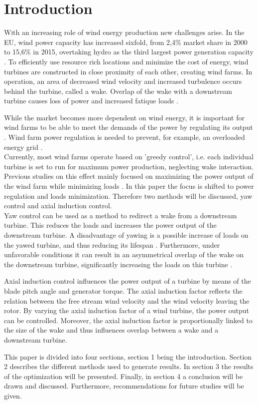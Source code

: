 \section{Introduction}
\lettrine[nindent=0em,lines=3]
With an increasing role of wind energy production new challenges arise\cite{Nat2016}. In the EU, wind power capacity has increased sixfold, from 2,4\% market share in 2000 to 15,6\% in 2015, overtaking hydro as the third largest power generation capacity \cite{EWEA2016}. To efficiently use resource rich locations and minimize the cost of energy, wind turbines are constructed in close proximity of each other, creating wind farms. In operation, an area of decreased wind velocity and increased turbulence occurs behind the turbine, called a wake. Overlap of the wake with a downstream turbine causes loss of power and increased fatique loads \cite{Boersma2017, Wilson2017, Dijk2016, Fleming2014, Zalkind2016}. 

While the market becomes more dependent on wind energy, it is important for wind farms to be able to meet the demands of the power by regulating its output \cite{Tande2003}. Wind farm power regulation is needed to prevent, for example, an overloaded energy grid \cite{Hansen2014}.  \\
\indent Currently, most wind farms operate based on 'greedy control', i.e. each individual turbine is set to run for maximum power production, neglecting wake interaction. Previous studies on this effect mainly focused on maximizing the power output of the wind farm while minimizing loads \cite{Dijk2016, vanDijk2016, Wilson2017}. In this paper the focus is shifted to power regulation and loads minimization. Therefore two methods will be discussed, yaw control and axial induction control. \\
\indent Yaw control can be used as a method to redirect a wake from a downstream turbine. This reduces the loads and increases the power output of the downstream turbine. A disadvantage of yawing is a possible increase of loads on the yawed turbine, and thus reducing its lifespan \cite{Zalkind2016,Kanev2017}. Furthermore, under unfavorable conditions it can result in an asymmetrical overlap of the wake on the downstream turbine, significantly increasing the loads on this turbine \cite{Wilson2017,Dijk2016}. 

Axial induction control influences the power output of a turbine by means of the blade pitch angle and generator torque. The axial induction factor reflects the relation between the free stream wind velocity and the wind velocity leaving the rotor. By varying the axial induction factor of a wind turbine, the power output can be controlled. Moreover, the axial induction factor is proportionally linked to the size of the wake and thus influences overlap between a wake and a downstream turbine.  

This paper is divided into four sections, section 1 being the introduction. Section 2 describes the different methods used to generate results. In section 3 the results of the optimization will be presented. Finally, in section 4 a conclusion will be drawn and discussed. Furthermore, recommendations for future studies will be given.

